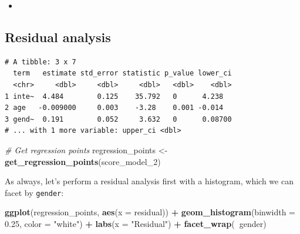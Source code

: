 \documentclass[12pt, krantz2,]{krantz}
\makeatletter
\newenvironment{Shaded}{\begin{snugshade}}{\end{snugshade}}
\newcommand{\CommentTok}[1]{\textcolor[rgb]{0.37,0.37,0.37}{\textit{#1}}}
\newcommand{\DataTypeTok}[1]{\textcolor[rgb]{0.27,0.27,0.27}{#1}}
\newcommand{\DecValTok}[1]{\textcolor[rgb]{0.06,0.06,0.06}{#1}}
\newcommand{\FloatTok}[1]{\textcolor[rgb]{0.06,0.06,0.06}{#1}}
\newcommand{\KeywordTok}[1]{\textcolor[rgb]{0.27,0.27,0.27}{\textbf{#1}}}
\newcommand{\NormalTok}[1]{#1}
\newcommand{\OperatorTok}[1]{\textcolor[rgb]{0.43,0.43,0.43}{\textbf{#1}}}
\newcommand{\StringTok}[1]{\textcolor[rgb]{0.5,0.5,0.5}{#1}}
\newenvironment{kframe}{%
\medskip{}
\setlength{\fboxsep}{.8em}
 \def\at@end@of@kframe{}%
 \ifinner\ifhmode%
  \def\at@end@of@kframe{\end{minipage}}%
  \begin{minipage}{\columnwidth}%
 \fi\fi%
 \def\FrameCommand##1{\hskip\@totalleftmargin \hskip-\fboxsep
 \colorbox{shadecolor}{##1}\hskip-\fboxsep
     \hskip-\linewidth \hskip-\@totalleftmargin \hskip\columnwidth}%
 \MakeFramed {\advance\hsize-\width
   \@totalleftmargin\z@ \linewidth\hsize
   \@setminipage}}%
 {\par\unskip\endMakeFramed%
 \at@end@of@kframe}
\renewenvironment{Shaded}{\begin{kframe}}{\end{kframe}}
\newenvironment{rmdblock}[1]
  {\begin{shaded*}
  \begin{itemize}
  \renewcommand{\labelitemi}{
    \raisebox{-.7\height}[0pt][0pt]{
    }
  }
  \item
  }
  {
  \end{itemize}
  \end{shaded*}
  }
\newenvironment{learncheck}
  {\begin{rmdblock}{warning}}
  {\end{rmdblock}}
\makeatother
\begin{document}
\begin{learncheck}

\end{learncheck}

\hypertarget{model4residuals}{%
\subsection{Residual analysis}\label{model4residuals}}

\begin{Shaded}
\end{Shaded}

\begin{verbatim}
# A tibble: 3 x 7
  term   estimate std_error statistic p_value lower_ci
  <chr>     <dbl>     <dbl>     <dbl>   <dbl>    <dbl>
1 inte~  4.484        0.125    35.792   0      4.238  
2 age   -0.009000     0.003    -3.28    0.001 -0.014  
3 gend~  0.191        0.052     3.632   0      0.08700
# ... with 1 more variable: upper_ci <dbl>
\end{verbatim}

\begin{Shaded}
\begin{Highlighting}[]
\CommentTok{# Get regression points}
\NormalTok{regression_points <-}\StringTok{ }\KeywordTok{get_regression_points}\NormalTok{(score_model_}\DecValTok{2}\NormalTok{)}
\end{Highlighting}
\end{Shaded}

As always, let's perform a residual analysis first with a histogram, which we can facet by \texttt{gender}:

\begin{Shaded}
\begin{Highlighting}[]
\KeywordTok{ggplot}\NormalTok{(regression_points, }\KeywordTok{aes}\NormalTok{(}\DataTypeTok{x =}\NormalTok{ residual)) }\OperatorTok{+}
\StringTok{  }\KeywordTok{geom_histogram}\NormalTok{(}\DataTypeTok{binwidth =} \FloatTok{0.25}\NormalTok{, }\DataTypeTok{color =} \StringTok{"white"}\NormalTok{) }\OperatorTok{+}
\StringTok{  }\KeywordTok{labs}\NormalTok{(}\DataTypeTok{x =} \StringTok{"Residual"}\NormalTok{) }\OperatorTok{+}
\StringTok{  }\KeywordTok{facet_wrap}\NormalTok{(}\OperatorTok{~}\NormalTok{gender)}
\end{Highlighting}
\end{Shaded}
\end{document}
